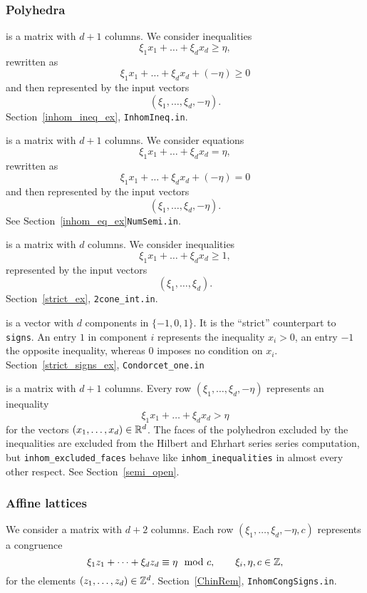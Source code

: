 \subsubsection{Polyhedra}

\begin{itemize}
	 is a matrix with $d+1$ columns. We consider inequalities
	$$
	\xi_1x_1+\dots+\xi_dx_d\ge \eta,
	$$
	rewritten as
	$$
	\xi_1x_1+\dots+\xi_dx_d+(-\eta) \ge 0
	$$
	and then represented by the input vectors
	$$
	(\xi_1,\dots,\xi_d,-\eta).
	$$
	Section~\ref{inhom_ineq_ex}, \verb|InhomIneq.in|.
	
	 is a matrix with $d+1$ columns. We consider equations
	$$
	\xi_1x_1+\dots+\xi_dx_d= \eta,
	$$
	rewritten as
	$$
	\xi_1x_1+\dots+\xi_dx_d+(-\eta) = 0
	$$
	and then represented by the input vectors
	$$
	(\xi_1,\dots,\xi_d,-\eta).
	$$
	See Section~\ref{inhom_eq_ex}\verb|NumSemi.in|.
	
	 is a matrix with $d$ columns. We consider inequalities
	$$
	\xi_1x_1+\dots+\xi_dx_d\ge 1,
	$$
	represented by the input vectors
	$$
	(\xi_1,\dots,\xi_d).
	$$
	Section~\ref{strict_ex}, \verb|2cone_int.in|.
	
	 is a vector with $d$ components in $\{-1,0,1\}$. It is the ``strict'' counterpart to \verb|signs|. An entry $1$ in component $i$ represents the inequality $x_i>0$, an entry $-1$ the opposite inequality, whereas $0$ imposes no condition on $x_i$. Section~\ref{strict_signs_ex}, \verb|Condorcet_one.in|
	
	 is a matrix with $d+1$ columns. Every row $(\xi_1,\dots,\xi_d,-\eta)$ represents an inequality
	$$
	\xi_1x_1+\dots+\xi_dx_d> \eta
	$$
	for the vectors $(x_1,\dots,x_d)\in{\mathbb R}^d$. The faces of the polyhedron excluded by the inequalities are excluded from the Hilbert and Ehrhart series series computation, but \verb|inhom_excluded_faces| behave like \verb|inhom_inequalities| in almost every other respect. See Section~\ref{semi_open}.
\end{itemize}

\subsubsection{Affine lattices}

\begin{itemize}
	 We consider a matrix with $d+2$ columns. Each row $(\xi_1,\dots,\xi_d,-\eta,c)$ represents a congruence
	$$
	\xi_1z_1+\dots+\xi_dz_d\equiv \eta \mod c, \qquad \xi_i,\eta,c\in{\mathbb Z},
	$$
	for the elements $(z_1,\dots,z_d)\in{\mathbb Z}^d$. Section~\ref{ChinRem}, \verb|InhomCongSigns.in|.
\end{itemize}


